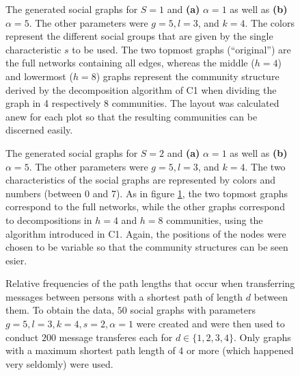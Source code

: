 \documentclass{scrartcl}
\begin{document}
\begin{figure}
    \centering
    \def\svgwidth{0.9\textwidth}
    
    \caption{The generated social graphs for $S=1$ and \textbf{(a)} $\alpha = 1$
    as well as \textbf{(b)} $\alpha = 5$. The other parameters were $g = 5,
    l = 3$, and $k = 4$. The colors represent the different
    social groups that are given by the single characteristic $s$ to be
    used.  The two topmost graphs (\enquote{original}) are the full
    networks containing all edges, whereas the middle ($h = 4$) and
    lowermost ($h=8$) graphs represent the community structure derived by
    the decomposition algorithm of C1 when dividing the graph in
    4 respectively 8 communities.
    The layout was calculated anew for each plot so that the resulting
    communities can be discerned easily.}
    \label{fig:331}
\end{figure}

\begin{figure}
    \centering
    \def\svgwidth{0.9\textwidth}
    
    \caption{The generated social graphs for $S=2$ and \textbf{(a)} $\alpha
    = 1$ as well as \textbf{(b)} $\alpha = 5$. The other parameters were 
    $g = 5, l = 3$, and $k = 4$. The two characteristics of
    the social graphs are represented by colors and numbers (between 0 and
    7).  As in figure \ref{fig:331}, the two topmost graphs correspond to
    the full networks, while the other graphs correspond to decompositions
    in $h = 4$ and $h = 8$ communities, using the algorithm introduced in C1.
    Again, the positions of the nodes were chosen to be variable so that
    the community structures can be seen esier.}
    \label{fig:332}
\end{figure}


\begin{figure}[bcht]
    \centering
    \caption{Relative frequencies of the path lengths that occur when
        transferring messages between persons with a shortest path of
        length $d$ between them. To obtain the data, $50$ social graphs
        with parameters $g = 5, l = 3, k = 4, s = 2, \alpha = 1$ were
        created and were then used to conduct $200$ message transferes each
        for $d\in\{1, 2, 3, 4\}$.  Only graphs with a maximum shortest path
        length of 4 or more (which happened very seldomly) were used. }
    \label{fig:12_mod}
\end{figure}
\end{document}
